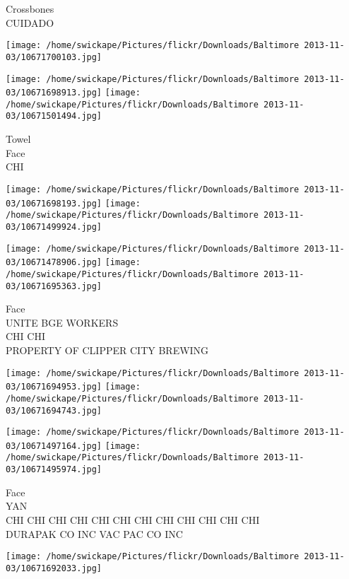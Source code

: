 \documentclass[10pt,letterpaper]{article}
\begin{document}
Crossbones\\
CUIDADO\\
\pagebreak

\texttt{[image: /home/swickape/Pictures/flickr/Downloads/Baltimore 2013-11-03/10671700103.jpg]}

\vspace{0.25in}
\texttt{[image: /home/swickape/Pictures/flickr/Downloads/Baltimore 2013-11-03/10671698913.jpg]}
\texttt{[image: /home/swickape/Pictures/flickr/Downloads/Baltimore 2013-11-03/10671501494.jpg]}

Towel\\
Face\\
CHI\\
\pagebreak

\texttt{[image: /home/swickape/Pictures/flickr/Downloads/Baltimore 2013-11-03/10671698193.jpg]}
\texttt{[image: /home/swickape/Pictures/flickr/Downloads/Baltimore 2013-11-03/10671499924.jpg]}

\texttt{[image: /home/swickape/Pictures/flickr/Downloads/Baltimore 2013-11-03/10671478906.jpg]}
\texttt{[image: /home/swickape/Pictures/flickr/Downloads/Baltimore 2013-11-03/10671695363.jpg]}

Face\\
UNITE BGE WORKERS\\
CHI CHI\\
PROPERTY OF CLIPPER CITY BREWING\\
\pagebreak

\texttt{[image: /home/swickape/Pictures/flickr/Downloads/Baltimore 2013-11-03/10671694953.jpg]}
\texttt{[image: /home/swickape/Pictures/flickr/Downloads/Baltimore 2013-11-03/10671694743.jpg]}

\texttt{[image: /home/swickape/Pictures/flickr/Downloads/Baltimore 2013-11-03/10671497164.jpg]}
\texttt{[image: /home/swickape/Pictures/flickr/Downloads/Baltimore 2013-11-03/10671495974.jpg]}

Face\\
YAN\\
CHI CHI CHI CHI CHI CHI CHI CHI CHI CHI CHI CHI\\
DURAPAK CO INC VAC PAC CO INC\\
\pagebreak

\texttt{[image: /home/swickape/Pictures/flickr/Downloads/Baltimore 2013-11-03/10671692033.jpg]}
\end{document}
